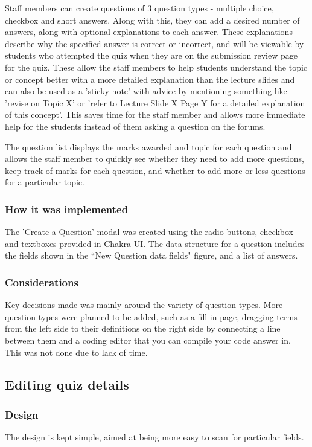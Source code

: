 Staff members can create questions of 3 question types - multiple choice, checkbox and short answers. Along with this, they can add a desired number of answers, along with optional explanations to each answer. These explanations describe why the specified answer is correct or incorrect, and will be viewable by students who attempted the quiz when they are on the submission review page for the quiz. These allow the staff members to help students understand the topic or concept better with a more detailed explanation than the lecture slides and can also be used as a 'sticky note' with advice by mentioning something like 'revise on Topic X' or 'refer to Lecture Slide X Page Y for a detailed explanation of this concept'. This saves time for the staff member and allows more immediate help for the students instead of them asking a question on the forums.

The question list displays the marks awarded and topic for each question and allows the staff member to quickly see whether they need to add more questions, keep track of marks for each question, and whether to add more or less questions for a particular topic. 

\subsubsection{How it was implemented}
The 'Create a Question' modal was created using the radio buttons, checkbox and textboxes provided in Chakra UI. The data structure for a question includes the fields shown in the ``New Question data fields" figure, and a list of answers. 

\subsubsection{Considerations}
Key decisions made was mainly around the variety of question types. More question types were planned to be added, such as a fill in page, dragging terms from the left side to their definitions on the right side by connecting a line between them and a coding editor that you can compile your code answer in. This was not done due to lack of time.

\subsection{Editing quiz details}

\subsubsection{Design}
The design is kept simple, aimed at being more easy to scan for particular fields. 

